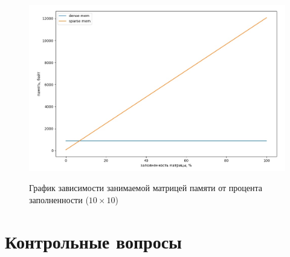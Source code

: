 \begin{figure}
	\centering
	\caption{График зависимости занимаемой матрицей памяти от процента заполненности ($10\times10$)}
	\includegraphics[width=0.8\linewidth]{img/mem10.jpg}
	\label{mem10}
\end{figure}

\pagebreak

\chapter{Контрольные вопросы}

